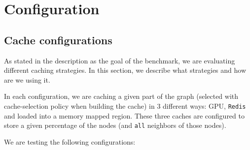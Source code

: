 \documentclass[11pt,a4paper]{article}
\begin{document}
\section{Configuration}

\subsection{Cache configurations}

As stated in the description as the goal of the benchmark, we are evaluating different caching strategies. In this section, we describe what strategies and how are we using it. 

In each configuration, we are caching a given part of the graph (selected with cache-selection policy when building the cache) in 3 different ways: GPU, \texttt{Redis} and loaded into a memory mapped region. These three caches are configured to store a given percentage of the nodes (and \texttt{all} neighbors of those nodes).

We are testing the following configurations:
\end{document}
